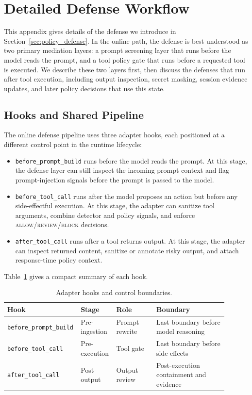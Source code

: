 \documentclass{article}
\begin{document}
\section{Detailed Defense Workflow}
\label{app:defense_workflow}

This appendix gives details of the defense we introduce in
Section~\ref{sec:policy_defense}. In the online path, the defense is best understood as
two primary mediation layers: a prompt screening layer that runs before the model
reads the prompt, and a tool policy gate that runs before a requested tool is
executed. We describe these two layers first, then discuss the defenses that run
after tool execution, including output inspection, secret masking, session
evidence updates, and later policy decisions that use this state.


\subsection{Hooks and Shared Pipeline}
The online defense pipeline uses three adapter hooks, each positioned at a different control point in the runtime lifecycle:
\begin{itemize}
  \item \texttt{before\_prompt\_build} runs before the model reads the prompt. At this
stage, the defense layer can still inspect the incoming prompt context and flag
prompt-injection signals before the prompt is passed to the model.

  \item \texttt{before\_tool\_call} runs after the model proposes an action but before any side-effectful execution. At this stage, the adapter can sanitize tool arguments, combine detector and policy signals, and enforce \textsc{allow}/\textsc{review}/\textsc{block} decisions.
  \item \texttt{after\_tool\_call} runs after a tool returns output. At this stage, the adapter can inspect returned content, sanitize or annotate risky output, and attach response-time policy context.
\end{itemize}

Table~\ref{tab:hook_pipeline_summary} gives a compact summary of each hook.

\begin{table}[H]
  \centering
  \small
  \caption{Adapter hooks and control boundaries.}
  \label{tab:hook_pipeline_summary}
  \begin{tabular}{@{}p{0.24\linewidth}p{0.16\linewidth}p{0.18\linewidth}p{0.32\linewidth}@{}}
    \toprule
    Hook & Stage & Role & Boundary \\
    \midrule
    \texttt{before\_prompt\_build} & Pre-ingestion & Prompt rewrite & Last boundary before model reasoning \\
    \texttt{before\_tool\_call} & Pre-execution & Tool gate & Last boundary before side effects \\
    \texttt{after\_tool\_call} & Post-output & Output review & Post-execution containment and evidence \\
    \bottomrule
  \end{tabular}
\end{table}
\end{document}
